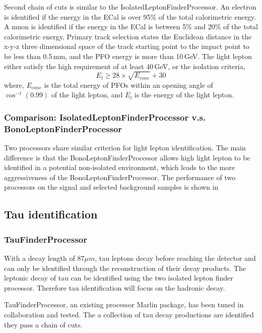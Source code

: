 Second chain of cuts is similar to the IsolatedLeptonFinderProcessor. An electron is identified if the energy in the ECal is over 95\% of the total calorimetric energy. A muon is identified if the energy in the ECal is between 5\% and 20\% of the total calorimetric energy. Primary track selection states the Euclidean distance in the x-y-z three dimensional space of the track starting point to the impact point to be less than 0.5\,mm, and the PFO energy is more than 10\,GeV. The light lepton either satisfy the high \pT requirement of at least 40\,GeV, or the isolation criteria,
\begin{equation}
E_{l} \geqslant 28 \times \sqrt{E_{cone}} + 30
\end{equation}
where, $E_{cone}$ is the total energy of PFOs within an opening angle of $\cos^{-1}(0.99)$ of the light lepton, and $E_{l}$ is the energy of the light lepton.

\subsubsection{Comparison: IsolatedLeptonFinderProcessor v.s. BonoLeptonFinderProcessor}

Two processors share similar criterion for light lepton identification. The main difference is that the BonoLeptonFinderProcessor allows high \pT light lepton to be identified in a potential non-isolated environment, which leads to the more aggressiveness of the BonoLeptonFinderProcessor. The performance of two processors on the signal and selected background samples is shown in 

\subsection{Tau identification}

\subsubsection{TauFinderProcessor}

With a decay length of 87$\mu{m}$, tau leptons decay before reaching the detector and can only be identified through the reconstruction of their decay products. The leptonic decay of tau can be identified using the two isolated lepton finder processor. Therefore tau identification will focus on the hadronic decay.

TauFinderProcessor, an existing processor Marlin package, has been tuned in collaboration and tested. The a collection of tau decay productions are identified they pass a chain of cuts.

